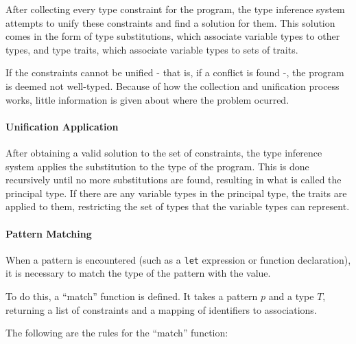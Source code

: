 \documentclass{article}
\begin{document}
After collecting every type constraint for the program, the type inference system attempts to unify these constraints and find a solution for them.
This solution comes in the form of type substitutions, which associate variable types to other types, and type traits, which associate variable types to sets of traits.

If the constraints cannot be unified - that is, if a conflict is found -, the program is deemed not well-typed.
Because of how the collection and unification process works, little information is given about where the problem ocurred.

\paragraph{Unification Application}

After obtaining a valid solution to the set of constraints, the type inference system applies the substitution to the type of the program.
This is done recursively until no more substitutions are found, resulting in what is called the principal type.
If there are any variable types in the principal type, the traits are applied to them, restricting the set of types that the variable types can represent.

\paragraph{Pattern Matching}

When a pattern is encountered (such as a \texttt{let} expression or function declaration), it is necessary to match the type of the pattern with the value.

To do this, a ``match'' function is defined.
It takes a pattern $p$ and a type $T$, returning a list of constraints and a mapping of identifiers to associations.

The following are the rules for the ``match'' function:






\end{document}
